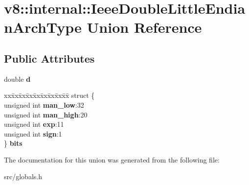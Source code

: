 \hypertarget{unionv8_1_1internal_1_1_ieee_double_little_endian_arch_type}{}\section{v8\+:\+:internal\+:\+:Ieee\+Double\+Little\+Endian\+Arch\+Type Union Reference}
\label{unionv8_1_1internal_1_1_ieee_double_little_endian_arch_type}
\subsection*{Public Attributes}
\begin{DoxyCompactItemize}
\item 
\hypertarget{unionv8_1_1internal_1_1_ieee_double_little_endian_arch_type_aae1ea6412f669875160955735ed06f43}{}double {\bfseries d}\label{unionv8_1_1internal_1_1_ieee_double_little_endian_arch_type_aae1ea6412f669875160955735ed06f43}

\item 
\hypertarget{unionv8_1_1internal_1_1_ieee_double_little_endian_arch_type_aadefe190187964a98dfe7bd91ff894df}{}\begin{tabbing}
xx\=xx\=xx\=xx\=xx\=xx\=xx\=xx\=xx\=\kill
struct \{\\
\>unsigned int {\bfseries man\_low}:32\\
\>unsigned int {\bfseries man\_high}:20\\
\>unsigned int {\bfseries exp}:11\\
\>unsigned int {\bfseries sign}:1\\
\} {\bfseries bits}\label{unionv8_1_1internal_1_1_ieee_double_little_endian_arch_type_aadefe190187964a98dfe7bd91ff894df}
\\

\end{tabbing}\end{DoxyCompactItemize}


The documentation for this union was generated from the following file\+:\begin{DoxyCompactItemize}
\item 
src/globals.\+h\end{DoxyCompactItemize}
